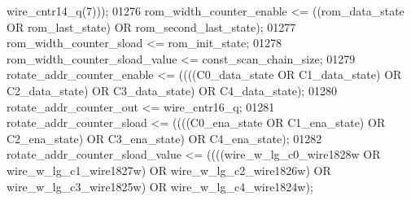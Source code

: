 \begin{DoxyCode}
{{      wire_cntr14_q}\textcolor{vhdlchar}{(}\textcolor{vhdllogic}{}\textcolor{vhdllogic}{7}\textcolor{vhdlchar}{)}\textcolor{vhdlchar}{)}\textcolor{vhdlchar}{)};
01276     \textcolor{vhdlchar}{rom_width_counter_enable} \textcolor{vhdlchar}{<=} \textcolor{vhdlchar}{(}\textcolor{vhdlchar}{(}\textcolor{vhdlchar}{rom_data_state} \textcolor{keywordflow}{OR} \textcolor{vhdlchar}{rom_last_state}\textcolor{vhdlchar}{)} \textcolor{keywordflow}{OR} \textcolor{vhdlchar}{
      rom_second_last_state}\textcolor{vhdlchar}{)};
01277     \textcolor{vhdlchar}{rom_width_counter_sload} \textcolor{vhdlchar}{<=} \textcolor{vhdlchar}{rom_init_state};
01278     \textcolor{vhdlchar}{rom_width_counter_sload_value} \textcolor{vhdlchar}{<=} \textcolor{vhdlchar}{const_scan_chain_size};
01279     \textcolor{vhdlchar}{rotate_addr_counter_enable} \textcolor{vhdlchar}{<=} \textcolor{vhdlchar}{(}\textcolor{vhdlchar}{(}\textcolor{vhdlchar}{(}\textcolor{vhdlchar}{(}\textcolor{vhdlchar}{C0_data_state} \textcolor{keywordflow}{OR} \textcolor{vhdlchar}{C1_data_state}\textcolor{vhdlchar}{)} \textcolor{keywordflow}{OR} \textcolor{vhdlchar}{
      C2_data_state}\textcolor{vhdlchar}{)} \textcolor{keywordflow}{OR} \textcolor{vhdlchar}{C3_data_state}\textcolor{vhdlchar}{)} \textcolor{keywordflow}{OR} \textcolor{vhdlchar}{C4_data_state}\textcolor{vhdlchar}{)};
01280     \textcolor{vhdlchar}{rotate_addr_counter_out} \textcolor{vhdlchar}{<=} \textcolor{vhdlchar}{wire_cntr16_q};
01281     \textcolor{vhdlchar}{rotate_addr_counter_sload} \textcolor{vhdlchar}{<=} \textcolor{vhdlchar}{(}\textcolor{vhdlchar}{(}\textcolor{vhdlchar}{(}\textcolor{vhdlchar}{(}\textcolor{vhdlchar}{C0_ena_state} \textcolor{keywordflow}{OR} \textcolor{vhdlchar}{C1_ena_state}\textcolor{vhdlchar}{)} \textcolor{keywordflow}{OR} \textcolor{vhdlchar}{
      C2_ena_state}\textcolor{vhdlchar}{)} \textcolor{keywordflow}{OR} \textcolor{vhdlchar}{C3_ena_state}\textcolor{vhdlchar}{)} \textcolor{keywordflow}{OR} \textcolor{vhdlchar}{C4_ena_state}\textcolor{vhdlchar}{)};
01282     \textcolor{vhdlchar}{rotate_addr_counter_sload_value} \textcolor{vhdlchar}{<=} \textcolor{vhdlchar}{(}\textcolor{vhdlchar}{(}\textcolor{vhdlchar}{(}\textcolor{vhdlchar}{(}\textcolor{vhdlchar}{wire_w_lg_c0_wire1828w} \textcolor{keywordflow}{OR} \textcolor{vhdlchar}{
      wire_w_lg_c1_wire1827w}\textcolor{vhdlchar}{)} \textcolor{keywordflow}{OR} \textcolor{vhdlchar}{wire_w_lg_c2_wire1826w}\textcolor{vhdlchar}{)} \textcolor{keywordflow}{OR} \textcolor{vhdlchar}{wire_w_lg_c3_wire1825w}\textcolor{vhdlchar}{)} \textcolor{keywordflow}{OR} \textcolor{vhdlchar}{
      wire_w_lg_c4_wire1824w}\textcolor{vhdlchar}{)};
}
\end{DoxyCode}

